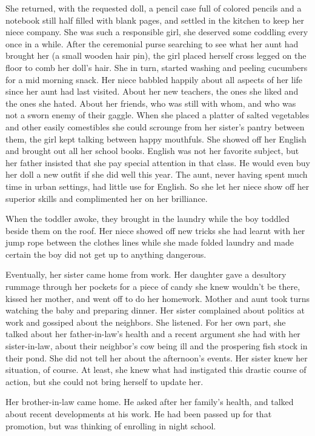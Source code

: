 \documentclass{article}
\begin{document}
She returned, with the requested doll, a pencil case full of colored pencils and a notebook still half filled with blank pages, and settled in the kitchen to keep her niece company. She was such a responsible girl, she deserved some coddling every once in a while. After the ceremonial purse searching to see what her aunt had brought her (a small wooden hair pin), the girl placed herself cross legged on the floor to comb her doll's hair. She in turn, started washing and peeling cucumbers for a mid morning snack. Her niece babbled happily about all aspects of her life since her aunt had last visited. About her new teachers, the ones she liked and the ones she hated. About her friends, who was still with whom, and who was not a sworn enemy of their gaggle. When she placed a platter of salted vegetables and other easily comestibles she could scrounge from her sister's pantry between them, the girl kept talking between happy mouthfuls. She showed off her English and brought out all her school books. English was not her favorite subject, but her father insisted that she pay special attention in that class. He would even buy her doll a new outfit if she did well this year. The aunt, never having spent much time in urban settings, had little use for English. So she let her niece show off her superior skills and complimented her on her brilliance. 

When the toddler awoke, they brought in the laundry while the boy toddled beside them on the roof. Her niece showed off new tricks she had learnt with her jump rope between the clothes lines while she made folded laundry and made certain the boy did not get up to anything dangerous.

Eventually, her sister came home from work. Her daughter gave a desultory rummage through her pockets for a piece of candy she knew wouldn't be there, kissed her mother, and went off to do her homework. Mother and aunt took turns watching the baby and preparing dinner. Her sister complained about politics at work and gossiped about the neighbors. She listened. For her own part, she talked about her father-in-law's health and a recent argument she had with her sister-in-law, about their neighbor's cow being ill and the prospering fish stock in their pond. She did not tell her about the afternoon's events. Her sister knew her situation, of course. At least, she knew what had instigated this drastic course of action, but she could not bring herself to update her.

Her brother-in-law came home. He asked after her family's health, and talked about recent developments at his work. He had been passed up for that promotion, but was thinking of enrolling in night school. 
\end{document}
